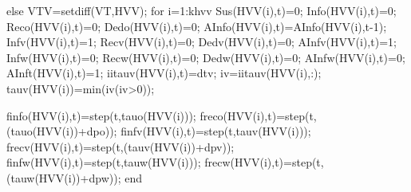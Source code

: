                                else
                                    VTV=setdiff(VT,HVV);
                                    for i=1:khvv
                                                Sus(HVV(i),t)=0;
                                                Info(HVV(i),t)=0;
                                                Reco(HVV(i),t)=0;
                                                Dedo(HVV(i),t)=0;
                                                AInfo(HVV(i),t)=AInfo(HVV(i),t-1);
                                                Infv(HVV(i),t)=1;
                                                Recv(HVV(i),t)=0;
                                                Dedv(HVV(i),t)=0;
                                                AInfv(HVV(i),t)=1; 
                                                Infw(HVV(i),t)=0;
                                                Recw(HVV(i),t)=0;
                                                Dedw(HVV(i),t)=0;
                                                AInfw(HVV(i),t)=0; 
                                                AInft(HVV(i),t)=1;  
                                                iitauv(HVV(i),t)=dtv; 
                                                iv=iitauv(HVV(i),:);
                                                tauv(HVV(i))=min(iv(iv>0)); 
                                                                                                                                          
                                                finfo(HVV(i),t)=step(t,tauo(HVV(i))); %
                                                freco(HVV(i),t)=step(t,(tauo(HVV(i))+dpo)); %
                                                finfv(HVV(i),t)=step(t,tauv(HVV(i))); %
                                                frecv(HVV(i),t)=step(t,(tauv(HVV(i))+dpv)); %
                                                finfw(HVV(i),t)=step(t,tauw(HVV(i))); %
                                                frecw(HVV(i),t)=step(t,(tauw(HVV(i))+dpw)); %
                                    end
                                    
